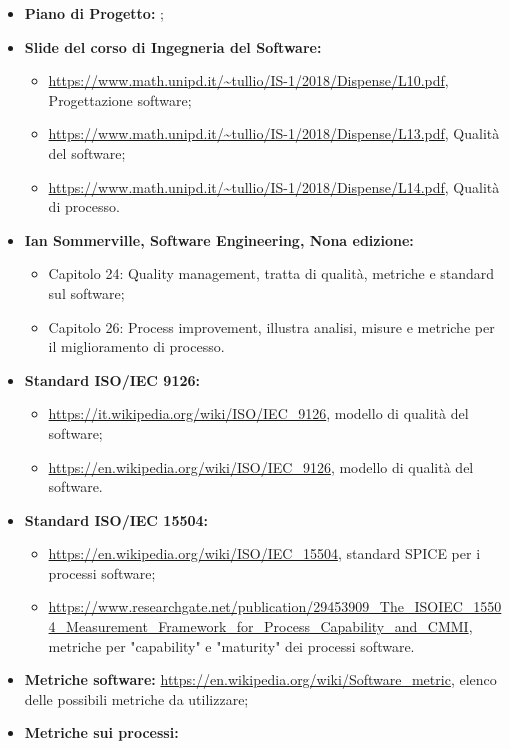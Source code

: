 \begin{itemize}
	\item \textbf{Piano di Progetto:} \PdP;
	\item \textbf{Slide del corso di Ingegneria del Software:}
	\begin{itemize}
				   \item \url{https://www.math.unipd.it/~tullio/IS-1/2018/Dispense/L10.pdf}, Progettazione software;
				   \item \url{https://www.math.unipd.it/~tullio/IS-1/2018/Dispense/L13.pdf}, Qualità del software;
				   \item \url{https://www.math.unipd.it/~tullio/IS-1/2018/Dispense/L14.pdf}, Qualità di processo.
	\end{itemize}
	\item \textbf{Ian Sommerville, Software Engineering, Nona edizione:}
		\begin{itemize}
		  	\item Capitolo 24: Quality management, tratta di qualità, metriche e standard sul software;
		  	\item Capitolo 26: Process improvement, illustra analisi, misure e metriche per il miglioramento di processo.
		\end{itemize}
	\item \textbf{Standard ISO/IEC 9126:}
		\begin{itemize}
			\item \url{https://it.wikipedia.org/wiki/ISO/IEC_9126}, modello di qualità del software;
			\item \url{https://en.wikipedia.org/wiki/ISO/IEC_9126}, modello di qualità del software.
		\end{itemize}
	\item \textbf{Standard ISO/IEC 15504:}
		 \begin{itemize}
				 \item \url{https://en.wikipedia.org/wiki/ISO/IEC_15504}, standard SPICE per i processi software;
				  \item \url{https://www.researchgate.net/publication/29453909_The_ISOIEC_15504_Measurement_Framework_for_Process_Capability_and_CMMI}, metriche per "capability" e "maturity" dei processi software.
		\end{itemize}
	\item \textbf{Metriche software:}\newline
				  \url{https://en.wikipedia.org/wiki/Software_metric}, elenco delle possibili metriche da utilizzare;
	\item \textbf{Metriche sui processi:}\newline

\end{itemize}
